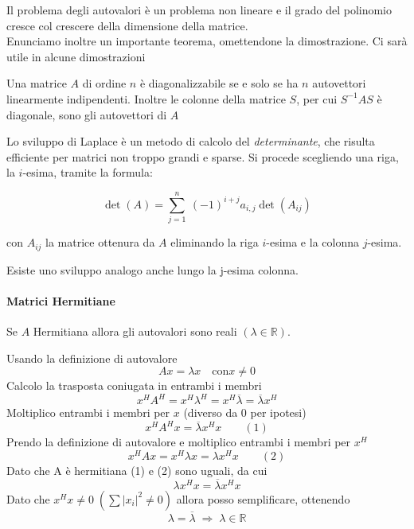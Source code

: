 Il problema degli autovalori \`e un problema non lineare e il grado del
polinomio cresce col crescere della dimensione della matrice.\\

Enunciamo inoltre un importante teorema, omettendone la dimostrazione.
Ci sar\`a utile in alcune dimostrazioni
\begin{theo}
  \label{eigenvalues:theo004}
  Una matrice $A$ di ordine $n$ \`e diagonalizzabile se e solo
  se ha $n$ autovettori linearmente indipendenti. Inoltre le colonne
  della matrice $S$, per cui $S^{-1}AS$ \`e diagonale, sono gli autovettori
  di $A$
\end{theo}

\begin{defn}
\label{sviluppo-laplace}
Lo sviluppo di Laplace \`e un metodo di calcolo del \emph{determinante}, che
risulta efficiente per matrici non troppo grandi e sparse. Si procede
scegliendo una riga, la $i$-esima, tramite la formula:

$$ \det(A) = \sum_{j=1}^n\ (-1)^{i + j} a_{i,j} \det(A_{ij}) $$

con $A_{ij}$ la matrice ottenura da $A$ eliminando la riga $i$-esima e la colonna
$j$-esima.

Esiste uno sviluppo analogo anche lungo la j-esima colonna.
\end{defn}


\paragraph{Matrici Hermitiane}
\begin{property}
Se $A$ Hermitiana allora gli autovalori sono reali $(\lambda \in \mathbb{R})$. 
\end{property}

\begin{thproof}
Usando la definizione di autovalore 
$$ Ax = \lambda x \quad \text{con} x \neq 0 $$
Calcolo la trasposta coniugata in entrambi i membri 
$$ x^H A^H = x^H \lambda^H= x^H \overline{\lambda} = \overline{\lambda} x^{H} $$
Moltiplico entrambi i membri per $x$ (diverso da 0 per ipotesi)
$$ x^H A^H x = \overline{\lambda}  x^{H} x \qquad (1) $$
Prendo la definizione di autovalore e moltiplico entrambi i membri per $x^{H}$
$$x^{H} A x = x^{H} \lambda x = \lambda x^{H} x \qquad (2)$$
Dato che A \`e hermitiana (1) e (2) sono uguali, da cui
$$ \lambda x^{H} x = \overline{\lambda} x^{H} x$$
Dato che $x^{H} x \neq 0 \; (\sum |x_i|^{2} \neq 0) $ allora posso
 semplificare, ottenendo
$$ \lambda=\overline{\lambda} \; \Rightarrow \; \lambda \in \mathbb{R} $$
\end{thproof}


